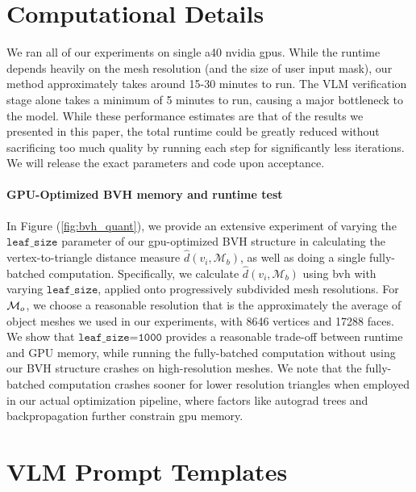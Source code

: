 \section{Computational Details} 
\label{sec:computational_details}
We ran all of our experiments on single a40 nvidia gpus. 
While the runtime depends heavily on the mesh resolution (and the size of user input mask), our method approximately takes around 15-30 minutes to run. The VLM verification stage alone takes a minimum of 5 minutes to run, causing a major bottleneck to the model. While these performance estimates are that of the results we presented in this paper, the total runtime could be greatly reduced without sacrificing too much quality by running each step for significantly less iterations. We will release the exact parameters and code upon acceptance. \paragraph{GPU-Optimized BVH memory and runtime test}
In Figure (\ref{fig:bvh_quant}), we provide an extensive experiment of varying the $\texttt{leaf\_size}$ parameter of our gpu-optimized BVH structure in calculating the vertex-to-triangle distance measure $\hat{d}(v_i,\mathcal{M}_b)$, as well as doing a single fully-batched computation. Specifically, we calculate $\hat{d}(v_i,\mathcal{M}_b)$ using bvh with varying $\texttt{leaf\_size}$, applied onto progressively subdivided mesh resolutions. For $\mathcal{M}_o$, we choose a reasonable resolution that is the approximately the average of object meshes we used in our experiments, with 8646 vertices and 17288 faces.
We show that  $\texttt{leaf\_size=1000}$ provides a reasonable trade-off between runtime and GPU memory, while running the fully-batched computation without using our BVH structure crashes on high-resolution meshes. We note that the fully-batched computation crashes sooner for lower resolution triangles when employed in our actual optimization pipeline, where factors like autograd trees and backpropagation further constrain gpu memory.
\newpage


\newcommand{\placeholder}[1]{\texttt{\textcolor{blue}{<#1>}}}

\section{VLM Prompt Templates}

